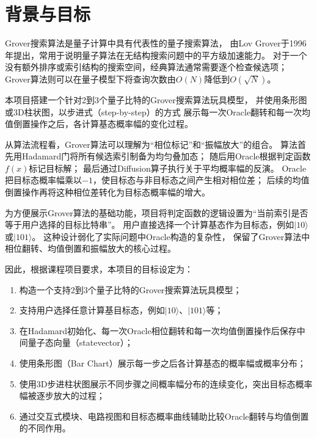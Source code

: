 \section{背景与目标}

Grover搜索算法是量子计算中具有代表性的量子搜索算法，
由Lov Grover于1996年提出，常用于说明量子算法在无结构搜索问题中的平方级加速能力。
对于一个没有额外排序或索引结构的搜索空间，经典算法通常需要逐个检查候选项；
Grover算法则可以在量子模型下将查询次数由\(O(N)\)降低到\(O(\sqrt{N})\)。


本项目搭建一个针对2到3个量子比特的Grover搜索算法玩具模型，
并使用条形图或3D柱状图，以步进式（step-by-step）的方式
展示每一次Oracle翻转和每一次均值倒置操作之后，各计算基态概率幅的变化过程。

从算法流程看，Grover算法可以理解为“相位标记”和“振幅放大”的组合。
算法首先用Hadamard门将所有候选索引制备为均匀叠加态；
随后用Oracle根据判定函数\(f(x)\)标记目标解；
最后通过Diffusion算子执行关于平均概率幅的反演。
Oracle把目标态概率幅乘以\(-1\)，使目标态与非目标态之间产生相对相位差；
后续的均值倒置操作再将这种相位差转化为目标态概率幅的增大。

为方便展示Grover算法的基础功能，项目将判定函数的逻辑设置为“当前索引是否等于用户选择的目标比特串”。
用户直接选择一个计算基态作为目标态，例如\(|10\rangle\)或\(|101\rangle\)。
这种设计弱化了实际问题中Oracle构造的复杂性，
保留了Grover算法中相位翻转、均值倒置和振幅放大的核心过程。

因此，根据课程项目要求，本项目的目标设定为：
\begin{enumerate}
  \item 构造一个支持2到3个量子比特的Grover搜索算法玩具模型；
  \item 支持用户选择任意计算基目标态，例如\(|10\rangle\)、\(|101\rangle\)等；
  \item 在Hadamard初始化、每一次Oracle相位翻转和每一次均值倒置操作后保存中间量子态向量（statevector）；
  \item 使用条形图（Bar Chart）展示每一步之后各计算基态的概率幅或概率分布；
  \item 使用3D步进柱状图展示不同步骤之间概率幅分布的连续变化，突出目标态概率幅被逐步放大的过程；
  \item 通过交互式模块、电路视图和目标态概率曲线辅助比较Oracle翻转与均值倒置的不同作用。
\end{enumerate}
